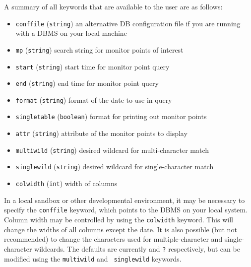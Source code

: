 A summary of all keywords that are available to the user are as follows:
\begin{itemize}
 \item {{\tt conffile} ({\tt string}) an alternative DB configuration
       file if you are running with a DBMS on your local machine}
 \item{{\tt mp} ({\tt string}) search string for monitor points of
        interest}
 \item{{\tt start} ({\tt string}) start time for monitor point query}
 \item{{\tt end} ({\tt string}) end time for monitor point query}
 \item{{\tt format} ({\tt string}) format of the date to use in query}
 \item{{\tt singletable} ({\tt boolean}) format for printing out monitor points}
 \item{{\tt attr} ({\tt string}) attribute of the monitor points to display}
 \item{{\tt multiwild} ({\tt string}) desired wildcard for
        multi-character match}
 \item{{\tt singlewild} ({\tt string}) desired wildcard for
        single-character match}
 \item{{\tt colwidth} ({\tt int}) width of columns}
\end{itemize}

In a local sandbox or other developmental environment, it may be
necessary to specify the {\tt conffile} keyword, which points to the
DBMS on your local system.  Column width may be controlled by using
the {\tt colwidth} keyword.  This will change the widths of all
columns except the date.  It is also possible (but not recommended) to
change the characters used for multiple-character and single-character
wildcards.  The defaults are currently {\tt *} and {\tt ?}
respectively, but can be modified using the {\tt multiwild} and {\tt
singlewild} keywords.
